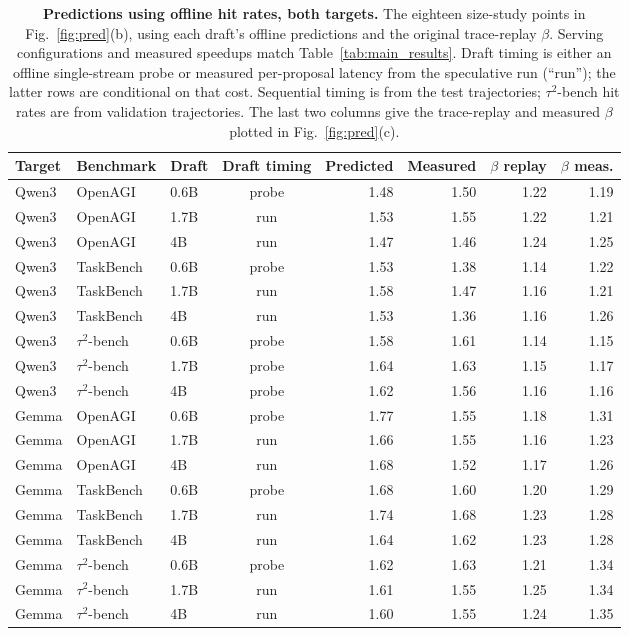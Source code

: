 \begin{table}[tbp]
\centering\small
\caption{\textbf{Predictions using offline hit rates, both targets.} The eighteen size-study points
in Fig.~\ref{fig:pred}(b), using each draft's offline predictions and the original trace-replay $\beta$.
Serving configurations and measured speedups match Table~\ref{tab:main_results}. Draft timing is
either an offline single-stream probe or measured per-proposal latency from the speculative run
(``run''); the latter rows are conditional on that cost. Sequential timing is from the test trajectories;
$\tau^2$-bench hit rates are from validation trajectories. The last two columns give the trace-replay
and measured $\beta$ plotted in Fig.~\ref{fig:pred}(c).}
\label{tab:prediction_inputs}
\begin{tabular}{lllcrrrr}
\toprule
Target & Benchmark & Draft & Draft timing & Predicted & Measured & $\beta$ replay & $\beta$ meas. \\
\midrule
Qwen3 & OpenAGI & 0.6B & probe & 1.48 & 1.50 & 1.22 & 1.19 \\
Qwen3 & OpenAGI & 1.7B & run & 1.53 & 1.55 & 1.22 & 1.21 \\
Qwen3 & OpenAGI & 4B & run & 1.47 & 1.46 & 1.24 & 1.25 \\
Qwen3 & TaskBench & 0.6B & probe & 1.53 & 1.38 & 1.14 & 1.22 \\
Qwen3 & TaskBench & 1.7B & run & 1.58 & 1.47 & 1.16 & 1.21 \\
Qwen3 & TaskBench & 4B & run & 1.53 & 1.36 & 1.16 & 1.26 \\
Qwen3 & $\tau^2$-bench & 0.6B & probe & 1.58 & 1.61 & 1.14 & 1.15 \\
Qwen3 & $\tau^2$-bench & 1.7B & probe & 1.64 & 1.63 & 1.15 & 1.17 \\
Qwen3 & $\tau^2$-bench & 4B & probe & 1.62 & 1.56 & 1.16 & 1.16 \\
Gemma & OpenAGI & 0.6B & probe & 1.77 & 1.55 & 1.18 & 1.31 \\
Gemma & OpenAGI & 1.7B & run & 1.66 & 1.55 & 1.16 & 1.23 \\
Gemma & OpenAGI & 4B & run & 1.68 & 1.52 & 1.17 & 1.26 \\
Gemma & TaskBench & 0.6B & probe & 1.68 & 1.60 & 1.20 & 1.29 \\
Gemma & TaskBench & 1.7B & run & 1.74 & 1.68 & 1.23 & 1.28 \\
Gemma & TaskBench & 4B & run & 1.64 & 1.62 & 1.23 & 1.28 \\
Gemma & $\tau^2$-bench & 0.6B & probe & 1.62 & 1.63 & 1.21 & 1.34 \\
Gemma & $\tau^2$-bench & 1.7B & run & 1.61 & 1.55 & 1.25 & 1.34 \\
Gemma & $\tau^2$-bench & 4B & run & 1.60 & 1.55 & 1.24 & 1.35 \\
\bottomrule
\end{tabular}
\end{table}

